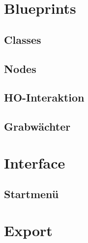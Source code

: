 \section{Blueprints}
    \subsection{Classes}
    \subsection{Nodes}
    \subsection{HO-Interaktion}
    \subsection{Grabwächter}
\section{Interface}
    \subsection{Startmenü}
\section{Export}